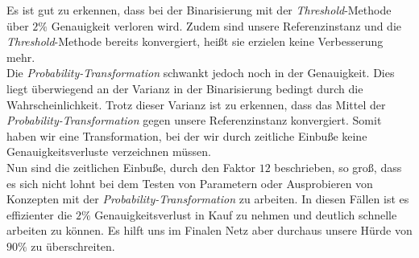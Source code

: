 Es ist gut zu erkennen, dass bei der Binarisierung mit der \textit{Threshold}-Methode über $2\%$ Genauigkeit verloren wird. Zudem sind unsere Referenzinstanz und die \textit{Threshold}-Methode bereits konvergiert, heißt sie erzielen keine Verbesserung mehr.\\
 Die \textit{Probability-Transformation} schwankt jedoch noch in der Genauigkeit. Dies liegt überwiegend an der Varianz in der Binarisierung bedingt durch die Wahrscheinlichkeit. Trotz dieser Varianz ist zu erkennen, dass das Mittel der \textit{Probability-Transformation} gegen unsere Referenzinstanz konvergiert. Somit haben wir eine Transformation, bei der wir durch zeitliche Einbuße keine Genauigkeitsverluste verzeichnen müssen.\\
 
Nun sind die zeitlichen Einbuße, durch den Faktor $12$ beschrieben, so groß, dass es sich nicht lohnt bei dem Testen von Parametern oder Ausprobieren von Konzepten mit der \textit{Probability-Transformation} zu arbeiten. In diesen Fällen ist es effizienter die $2\%$ Genauigkeitsverlust in Kauf zu nehmen und deutlich schnelle arbeiten zu können. Es hilft uns im Finalen Netz aber durchaus unsere Hürde von $90\%$ zu überschreiten.



